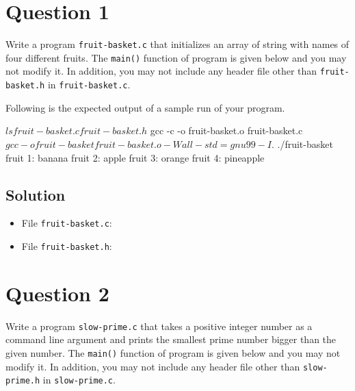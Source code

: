 \documentclass[12pt,letterpaper,twoside]{article}
\begin{document}


\section*{Question 1}

Write a program \texttt{fruit-basket.c} that initializes an array of string with names of four different fruits.
The \texttt{main()} function of program is given below and you may not modify it.
In addition, you may not include any header file other than \texttt{fruit-basket.h} in \texttt{fruit-basket.c}.

\lstset{language=c,tabsize=4}


Following is the expected output of a sample run of your program.

\begin{terminal}
$ ls
fruit-basket.c fruit-basket.h
$ gcc -c -o fruit-basket.o fruit-basket.c
$ gcc -o fruit-basket fruit-basket.o -Wall -std=gnu99 -I.
$ ./fruit-basket
fruit 1: banana
fruit 2: apple
fruit 3: orange
fruit 4: pineapple
\end{terminal}

\newpage

\subsection*{Solution}

\lstset{language=c,tabsize=4}
\begin{itemize}
\item[] File \texttt{fruit-basket.c}:

\newpage
\item[] File \texttt{fruit-basket.h}:

\end{itemize}

\section*{Question 2}

Write a program \texttt{slow-prime.c} that takes a positive integer number as a command line argument and prints the smallest prime number bigger than the given number.
The \texttt{main()} function of program is given below and you may not modify it.
In addition, you may not include any header file other than \texttt{slow-prime.h} in \texttt{slow-prime.c}.
\end{document}
